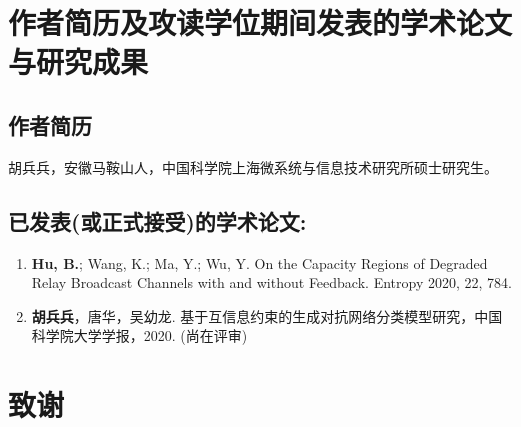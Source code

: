 \chapter{作者简历及攻读学位期间发表的学术论文与研究成果}


\section*{作者简历}

胡兵兵，安徽马鞍山人，中国科学院上海微系统与信息技术研究所硕士研究生。

\section*{已发表(或正式接受)的学术论文:}

{
\setlist[enumerate]{}%
\begin{enumerate}[nosep]
    \item \textbf{Hu, B.}; Wang, K.; Ma, Y.; Wu, Y. On the Capacity Regions of Degraded Relay Broadcast Channels with and without Feedback. Entropy 2020, 22, 784.
    \item \textbf{胡兵兵}，唐华，吴幼龙. 基于互信息约束的生成对抗网络分类模型研究，中国科学院大学学报，2020. (尚在评审)
\end{enumerate}
}

% 
% 
% 

\chapter[致谢]{致\quad 谢}%
\thispagestyle{noheaderstyle}%

